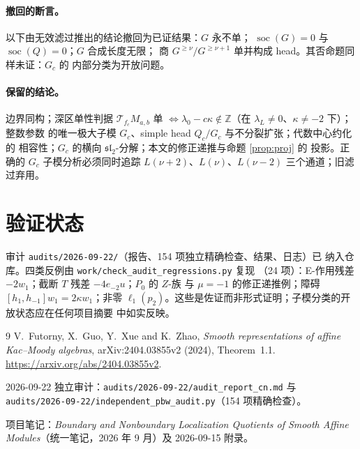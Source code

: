 \documentclass[11pt]{article}
\newcommand{\Z}{\mathbb Z}
\newcommand{\slc}{\mathfrak{sl}_2}
\begin{document}
\paragraph{撤回的断言。}
以下由无效滤过推出的结论撤回为已证结果：$G$ 永不单；
$\operatorname{soc}(G)=0$ 与 $\operatorname{soc}(Q)=0$；$G$ 合成长度无限；
商 $G^{\ge\nu}/G^{\ge\nu+1}$ 单并构成 head。其否命题同样未证：$G_c$ 的
内部分类为开放问题。

\paragraph{保留的结论。}
边界同构；深区单性判据 $\mathcal T_{f_c}M_{a,b}$ 单 $\iff
\lambda_0-c\kappa\notin\Z$（在 $\lambda_L\ne0$、$\kappa\ne-2$ 下）；整数参数
的唯一极大子模 $G_c$、simple head $Q_c/G_c$ 与不分裂扩张；代数中心约化的
相容性；$G_c$ 的横向 $\slc$-分解；本文的修正递推与命题 \ref{prop:proj} 的
投影。正确的 $G_c$ 子模分析必须同时追踪 $L(\nu+2)$、$L(\nu)$、$L(\nu-2)$
三个通道；旧滤过弃用。

\section{验证状态}

审计 \texttt{audits/2026-09-22/}（报告、154 项独立精确检查、结果、日志）已
纳入仓库。四类反例由 \texttt{work/check\_audit\_regressions.py} 复现
（24 项）：E-作用残差 $-2w_1$；截断 $T$ 残差 $-4e_{-2}u$；$P_0$ 的 $Z$-族
与 $\mu=-1$ 的修正递推例；障碍 $[h_1,h_{-1}]w_1=2\kappa w_1$；非零
$\ell_1(p_2)$。这些是佐证而非形式证明；子模分类的开放状态应在任何项目摘要
中如实反映。

\begin{thebibliography}{9}
V.~Futorny, X.~Guo, Y.~Xue and K.~Zhao,
\emph{Smooth representations of affine Kac--Moody algebras},
arXiv:2404.03855v2 (2024), Theorem~1.1.
\url{https://arxiv.org/abs/2404.03855v2}.

2026-09-22 独立审计：\texttt{audits/2026-09-22/audit\_report\_cn.md} 与
\texttt{audits/2026-09-22/independent\_pbw\_audit.py}（154 项精确检查）。

项目笔记：\emph{Boundary and Nonboundary Localization Quotients of Smooth
Affine Modules}（统一笔记，2026 年 9 月）及 2026-09-15 附录。
\end{thebibliography}
\end{document}
